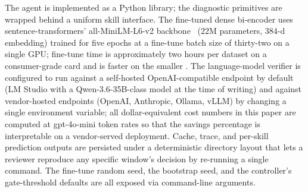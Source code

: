 The agent is implemented as a Python library; the diagnostic primitives are wrapped behind a uniform skill interface. The fine-tuned dense bi-encoder uses sentence-transformers' all-MiniLM-L6-v2 backbone~\cite{reimers2019sbert} ($22$M parameters, $384$-d embedding) trained for five epochs at a fine-tune batch size of thirty-two on a single GPU; fine-tune time is approximately two hours per dataset on a consumer-grade card and is faster on the smaller \dsotel{}. The language-model verifier is configured to run against a self-hosted OpenAI-compatible endpoint by default (LM Studio with a Qwen-3.6-35B-class model at the time of writing) and against vendor-hosted endpoints (OpenAI, Anthropic, Ollama, vLLM) by changing a single environment variable; all dollar-equivalent cost numbers in this paper are computed at gpt-4o-mini token rates so that the savings percentage is interpretable on a vendor-served deployment. Cache, trace, and per-skill prediction outputs are persisted under a deterministic directory layout that lets a reviewer reproduce any specific window's decision by re-running a single command. The fine-tune random seed, the bootstrap seed, and the controller's gate-threshold defaults are all exposed via command-line arguments.

\FloatBarrier
